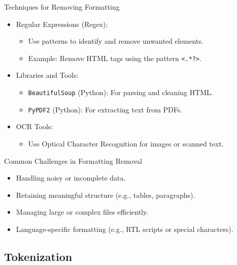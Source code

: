 \documentclass{beamer}
\begin{document}
\begin{frame}{Techniques for Removing Formatting}
    \begin{itemize}
        \item Regular Expressions (Regex):
        \begin{itemize}
            \item Use patterns to identify and remove unwanted elements.
            \item Example: Remove HTML tags using the pattern \texttt{<.*?>}.
        \end{itemize}
        \item Libraries and Tools:
        \begin{itemize}
            \item \texttt{BeautifulSoup} (Python): For parsing and cleaning HTML.
            \item \texttt{PyPDF2} (Python): For extracting text from PDFs.
        \end{itemize}
        \item OCR Tools:
        \begin{itemize}
            \item Use Optical Character Recognition for images or scanned text.
        \end{itemize}
    \end{itemize}
\end{frame}

\begin{frame}{Common Challenges in Formatting Removal}
    \begin{itemize}
        \item Handling noisy or incomplete data.
        \item Retaining meaningful structure (e.g., tables, paragraphs).
        \item Managing large or complex files efficiently.
        \item Language-specific formatting (e.g., RTL scripts or special characters).
    \end{itemize}
\end{frame}

\subsection{Tokenization}
\end{document}
